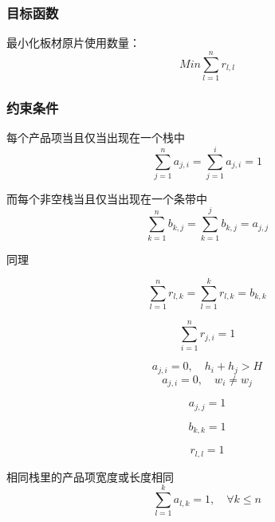 \documentclass[bwprint]{gmcmthesis}
\begin{document}
\subsubsection{目标函数}
最小化板材原片使用数量：
\begin{equation}
    Min \sum_{l=1}^{n} r_{l,l} 
\end{equation}

\subsubsection{约束条件}
每个产品项当且仅当出现在一个栈中
\begin{equation}
    \sum_{j=1}^{n} a_{j,i}=\sum_{j=1}^{i} a_{j,i}=1
\end{equation}  

而每个非空栈当且仅当出现在一个条带中
\begin{equation}
    \sum_{k=1}^{n} b_{k,j}=\sum_{k=1}^{j} b_{k,j}=a_{j,j}
\end{equation}  

同理

\begin{equation}
    \sum_{l=1}^{n} r_{l,k}=\sum_{l=1}^{k} r_{l,k} =b_{k,k}
\end{equation}  

\begin{equation}
    \sum_{i=1}^{n} r_{j,i}=1
\end{equation}  


\begin{equation}
    a_{j,i}=0, \quad   h_{i}+h_{j}>H
\end{equation}
\begin{equation}
    a_{j,i}=0, \quad  w_{i} \ne w_{j}
\end{equation}


\begin{equation}
    a_{j,j}=1
\end{equation}


\begin{equation}
    b_{k,k}=1
\end{equation}

\begin{equation}
    r_{l,l}=1
\end{equation}












相同栈里的产品项宽度或长度相同
\begin{equation}
    \sum_{l=1}^{k} a_{l,k}=1,\quad \forall k\leqslant n
\end{equation}  
\end{document}

